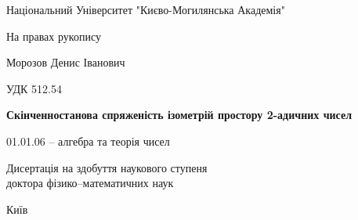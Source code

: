 \documentclass[a4paper,12pt]{article} \usepackage{a4wide}
\numberwithin{equation}{subsection}
\begin{document}
\begin{titlepage}
  \vspace*{0.2cm}
  \begin{center}
    Національний Університет "Києво-Могилянська Академія"
  \end{center}
  \vspace{0.6cm}
  \begin{flushright}
    На правах рукопису
  \end{flushright}
  \vspace{1cm}
  \begin{center}
    Морозов Денис Іванович
  \end{center}
%
  \begin{flushright}
    УДК 512.54
  \end{flushright}
%
%
  \begin{center}
    \textbf{Скінченностанова спряженість ізометрій простору 2-адичних
      чисел}

    \vspace{0.5cm}

    01.01.06 -- алгебра та теорія чисел
  \end{center}
%
%
  \vspace{1 cm}
  \begin{center}
    Дисертація на здобуття наукового ступеня \\ доктора  фізико--математичних наук \\
  \end{center}

  \vspace{8 cm}


\begin{center}
  Київ
\end{center}
\end{titlepage}

\setcounter{page}{2}
\tableofcontents
\newpage
\end{document}
